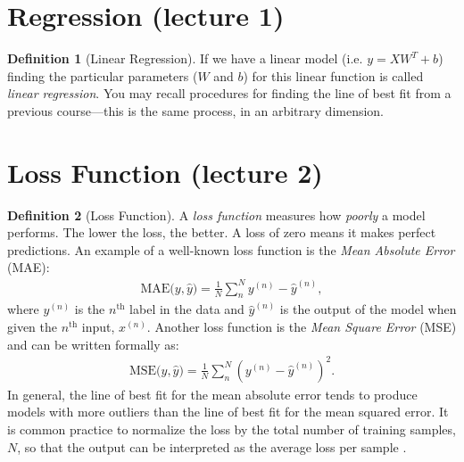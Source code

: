 \documentclass[11pt]{article}
\numberwithin{equation}{section}
\theoremstyle{definition}%
\newtheorem{definition}{Definition}[section]%
\begin{document}
\section{Regression (lecture 1)}
\begin{definition}[Linear Regression]

If we have a linear model (i.e. $y=XW^T+b$) finding the particular parameters ($W$ and $b$) for this linear function is called \emph{linear regression}. You may recall procedures for finding the line of best fit from a previous course---this is the same process, in an arbitrary dimension.
\end{definition}

\section{Loss Function (lecture 2)}
\begin{definition}[Loss Function]
A \emph{loss function} measures how \emph{poorly} a model performs. The lower the loss, the better. A loss of zero means it makes perfect predictions. An example of a well-known loss function is the \emph{Mean Absolute Error} (MAE):
\begin{align}
    \text{MAE($y, \hat{y}$)} = \frac{1}{N}\sum_{n}^{N}{y^{(n)} - \hat{y}^{(n)}},
\end{align}
where $y^{(n)}$ is the $n^{\text{th}}$ label in the data and $\hat{y}^{(n)}$ is the output of the model when given the $n^{\text{th}}$ input, $x^{(n)}$. Another loss function is the \emph{Mean Square Error} (MSE) and can be written formally as:
\begin{align}
    \text{MSE($y, \hat{y}$)} = \frac{1}{N}\sum_{n}^{N}{(y^{(n)} - \hat{y}^{(n)})^2}.
\end{align}
In general, the line of best fit for the mean absolute error tends to produce models with more outliers than the line of best fit for the mean squared error. It is common practice to normalize the loss by the total number of training samples, $N$, so that the output can be interpreted as the average loss per sample \cite{Cornell}.

\end{definition}
\end{document}
